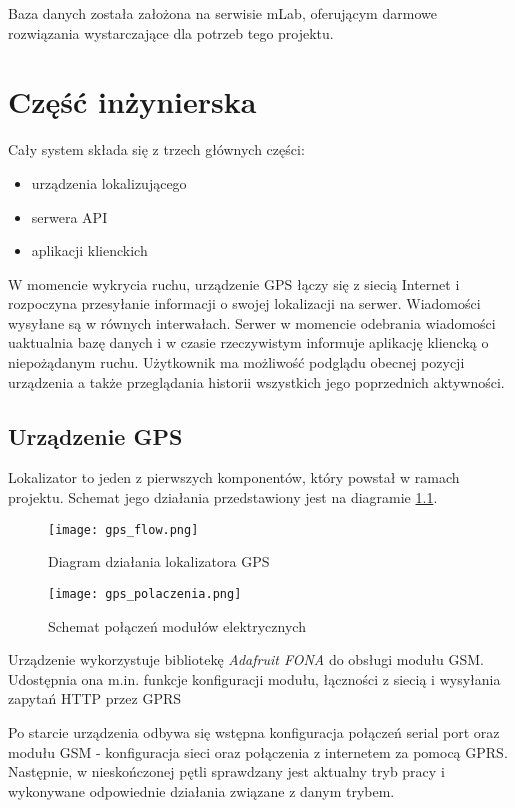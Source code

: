 \documentclass[eng,printmode]{mgr}
\begin{document}
Baza danych została założona na serwisie mLab\cite{mlab}, oferującym darmowe rozwiązania wystarczające dla potrzeb tego projektu.

\chapter{Część inżynierska}
Cały system składa się z trzech głównych części:
\begin{itemize}
\item urządzenia lokalizującego
\item serwera API
\item aplikacji klienckich
\end{itemize}

W momencie wykrycia ruchu, urządzenie GPS łączy się z siecią Internet i rozpoczyna przesyłanie informacji o swojej lokalizacji na serwer. Wiadomości wysyłane są w równych interwałach. Serwer w momencie odebrania wiadomości uaktualnia bazę danych i w czasie rzeczywistym informuje aplikację kliencką o niepożądanym ruchu. Użytkownik ma możliwość podglądu obecnej pozycji urządzenia a także przeglądania historii wszystkich jego poprzednich aktywności.



\section{Urządzenie GPS}
Lokalizator to jeden z pierwszych komponentów, który powstał w ramach projektu. Schemat jego działania przedstawiony jest na diagramie \ref{fig:board-diagram}.
\begin{figure}
\centering
\texttt{[image: gps\_flow.png]}
\caption{Diagram działania lokalizatora GPS}
\label{fig:board-diagram}
\end{figure}

\begin{figure}
\centering
\texttt{[image: gps\_polaczenia.png]}
\caption{Schemat połączeń modułów elektrycznych}
\end{figure}

Urządzenie wykorzystuje bibliotekę \textit{Adafruit FONA} do obsługi modułu GSM. Udostępnia ona m.in. funkcje konfiguracji modułu, łączności z siecią i wysyłania zapytań HTTP przez GPRS

Po starcie urządzenia odbywa się wstępna konfiguracja połączeń serial port oraz modułu GSM - konfiguracja sieci oraz połączenia z internetem za pomocą GPRS. Następnie, w nieskończonej pętli sprawdzany jest aktualny tryb pracy i wykonywane odpowiednie działania związane z danym trybem. 
\end{document}
